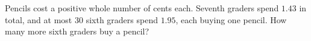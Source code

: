 Pencils cost a positive whole number of cents each. Seventh graders spend $1.43$ in total, and at most $30$ sixth graders spend $1.95$, each buying one pencil. How many more sixth graders buy a pencil?
